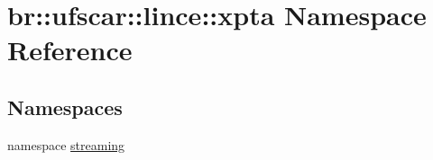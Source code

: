 \hypertarget{namespacebr_1_1ufscar_1_1lince_1_1xpta}{
\section{br::ufscar::lince::xpta Namespace Reference}
\label{namespacebr_1_1ufscar_1_1lince_1_1xpta}
}
\subsection*{Namespaces}
\begin{DoxyCompactItemize}
\item 
namespace \hyperlink{namespacebr_1_1ufscar_1_1lince_1_1xpta_1_1streaming}{streaming}
\end{DoxyCompactItemize}
